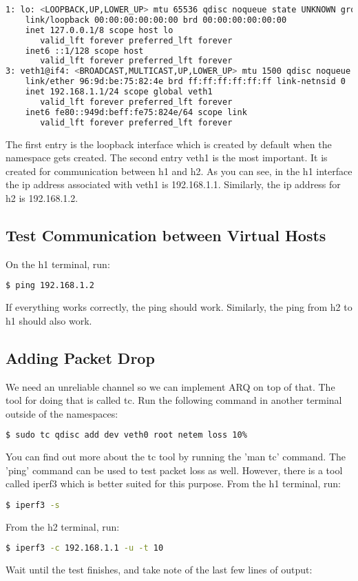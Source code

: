 \documentclass[11pt]{article}
\begin{document}
\begin{minipage}{\linewidth}
\begin{lstlisting}[caption={Output of 'ip addr'}, language=bash]
1: lo: <LOOPBACK,UP,LOWER_UP> mtu 65536 qdisc noqueue state UNKNOWN group default qlen 1
    link/loopback 00:00:00:00:00:00 brd 00:00:00:00:00:00
    inet 127.0.0.1/8 scope host lo
       valid_lft forever preferred_lft forever
    inet6 ::1/128 scope host 
       valid_lft forever preferred_lft forever
3: veth1@if4: <BROADCAST,MULTICAST,UP,LOWER_UP> mtu 1500 qdisc noqueue state UP group default qlen 1000
    link/ether 96:9d:be:75:82:4e brd ff:ff:ff:ff:ff:ff link-netnsid 0
    inet 192.168.1.1/24 scope global veth1
       valid_lft forever preferred_lft forever
    inet6 fe80::949d:beff:fe75:824e/64 scope link 
       valid_lft forever preferred_lft forever
\end{lstlisting}
\end{minipage}
The first entry is the loopback interface which is created by default when the namespace gets created. The second entry veth1 is the most important. It is created for communication between h1 and h2. As you can see, in the h1 interface the ip address associated with veth1 is 192.168.1.1. Similarly, the ip address for h2 is 192.168.1.2.
\subsection{Test Communication between Virtual Hosts}
On the h1 terminal, run:
\begin{lstlisting}[language=bash]
$ ping 192.168.1.2
\end{lstlisting}
If everything works correctly, the ping should work. Similarly, the ping from h2 to h1 should also work.
\subsection{Adding Packet Drop}
We need an unreliable channel so we can implement ARQ on top of that. The tool for doing that is called tc.
Run the following command in another terminal outside of the namespaces:
\begin{lstlisting}[language=bash]
$ sudo tc qdisc add dev veth0 root netem loss 10%
\end{lstlisting}
You can find out more about the tc tool by running the 'man tc' command.
The 'ping' command can be used to test packet loss as well. However, there is a tool called iperf3 which is better suited for this purpose. From the h1 terminal, run:
\begin{lstlisting}[language=bash]
$ iperf3 -s
\end{lstlisting}
From the h2 terminal, run:
\begin{lstlisting}[language=bash]
$ iperf3 -c 192.168.1.1 -u -t 10
\end{lstlisting}
Wait until the test finishes, and take note of the last few lines of output:
\end{document}

